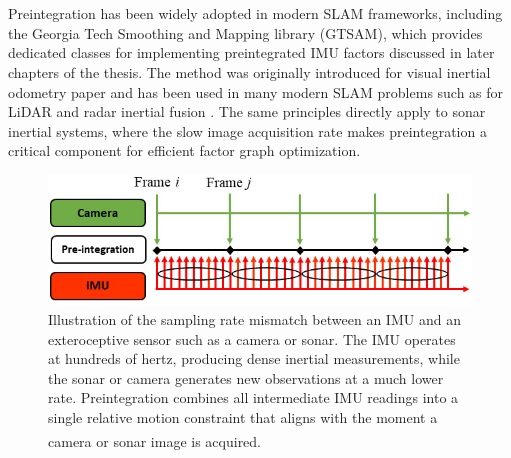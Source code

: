 \\ \\
Preintegration has been widely adopted in modern SLAM frameworks, including the Georgia Tech Smoothing and Mapping library (GTSAM), which provides dedicated classes for implementing preintegrated IMU factors discussed in later chapters of the thesis. The method was originally introduced for visual inertial odometry paper \cite{preintegration_camera_paper} and has been used in many modern SLAM problems such as for LiDAR and radar inertial fusion \cite{preintegration_radar_paper}. The same principles directly apply to sonar inertial systems, where the slow image acquisition rate makes preintegration a critical component for efficient factor graph optimization.
\begin{figure}[H]
    \centering
    \includegraphics[width=1.0\linewidth]{Pictures/Preintegration/Introduction/Camera_IMU_example.jpg}
    \caption{Illustration of the sampling rate mismatch between an IMU and an exteroceptive sensor such as a camera or sonar. The IMU operates at hundreds of hertz, producing dense inertial measurements, while the sonar or camera generates new observations at a much lower rate. Preintegration combines all intermediate IMU readings into a single relative motion constraint that aligns with the moment a camera or sonar image is acquired.\textsuperscript{\cite{preintegration_camera_imu_picture}}}
    \label{fig:preintegration-camera-imu-example}
\end{figure}


